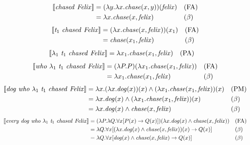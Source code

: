 \documentclass[11pt]{article}
\begin{document}
\bigskip
\begin{align*}
\llbracket \text{\textit{chased} \textit{Felix}} \rrbracket &= (\lambda y.\lambda x.\mathit{chase}(x, y))(\mathit{felix}) && \text{(FA)} \\
&= \lambda x.\mathit{chase}(x, \mathit{felix}) && (\beta)
\end{align*}
\begin{align*}
\llbracket \text{\textit{t$_{1}$} \textit{chased} \textit{Felix}} \rrbracket &= (\lambda x.\mathit{chase}(x, \mathit{felix}))(x_{1}) && \text{(FA)} \\
&= \mathit{chase}(x_{1}, \mathit{felix}) && (\beta)
\end{align*}
\begin{align*}
\llbracket \text{$\lambda_{1}$ \textit{t$_{1}$} \textit{chased} \textit{Felix}} \rrbracket &= \lambda x_{1}.\mathit{chase}(x_{1}, \mathit{felix}) && \text{(PA)}
\end{align*}
\begin{align*}
\llbracket \text{\textit{who} $\lambda_{1}$ \textit{t$_{1}$} \textit{chased} \textit{Felix}} \rrbracket &= (\lambda P.P)(\lambda x_{1}.\mathit{chase}(x_{1}, \mathit{felix})) && \text{(FA)} \\
&= \lambda x_{1}.\mathit{chase}(x_{1}, \mathit{felix}) && (\beta)
\end{align*}
\begin{align*}
\llbracket \text{\textit{dog} \textit{who} $\lambda_{1}$ \textit{t$_{1}$} \textit{chased} \textit{Felix}} \rrbracket &= \lambda x.(\lambda x.\mathit{dog}(x))(x) \wedge (\lambda x_{1}.\mathit{chase}(x_{1}, \mathit{felix}))(x) && \text{(PM)} \\
&= \lambda x.\mathit{dog}(x) \wedge (\lambda x_{1}.\mathit{chase}(x_{1}, \mathit{felix}))(x) && (\beta) \\
&= \lambda x.\mathit{dog}(x) \wedge \mathit{chase}(x, \mathit{felix}) && (\beta)
\end{align*}
\begin{align*}
\llbracket \text{\textit{every} \textit{dog} \textit{who} $\lambda_{1}$ \textit{t$_{1}$} \textit{chased} \textit{Felix}} \rrbracket &= (\lambda P.\lambda Q.\forall x[P(x) \rightarrow Q(x)])(\lambda x.\mathit{dog}(x) \wedge \mathit{chase}(x, \mathit{felix})) && \text{(FA)} \\
&= \lambda Q.\forall x[(\lambda x.\mathit{dog}(x) \wedge \mathit{chase}(x, \mathit{felix}))(x) \rightarrow Q(x)] && (\beta) \\
&= \lambda Q.\forall x[\mathit{dog}(x) \wedge \mathit{chase}(x, \mathit{felix}) \rightarrow Q(x)] && (\beta)
\end{align*}
\end{document}
